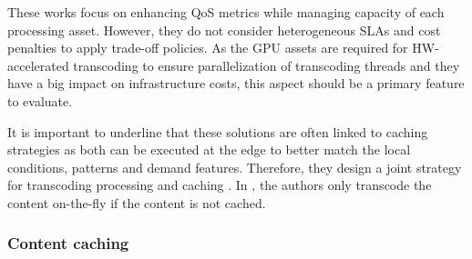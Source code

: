 These works focus on enhancing QoS metrics while managing capacity of each processing asset. However, they do not consider heterogeneous SLAs and cost penalties to apply trade-off policies. As the GPU assets are required for \hbox{HW-accelerated} transcoding to ensure parallelization of transcoding threads and they have a big impact on infrastructure costs, this aspect should be a primary feature to evaluate.

It is important to underline that these solutions are often linked to caching strategies as both can be executed at the edge to better match the local conditions, patterns and demand features. Therefore, they design a joint strategy for transcoding processing and caching \cite{Liu2021, Tran2019, Rezvani2019, Wang2021, Jia2019}. In \cite{Dutta2016}, the authors only transcode the content on-the-fly if the content is not cached.

\subsubsection{Content caching}


